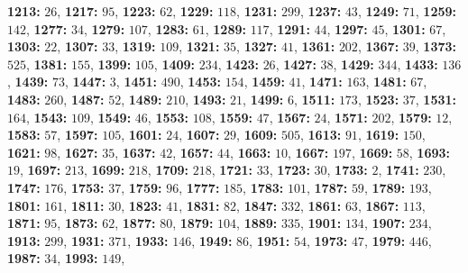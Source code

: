 \textsf{\bfseries 1213:} $26$, \textsf{\bfseries 1217:} $95$, \textsf{\bfseries 1223:} $62$, \textsf{\bfseries 1229:} $118$, 
\textsf{\bfseries 1231:} $299$, \textsf{\bfseries 1237:} $43$, \textsf{\bfseries 1249:} $71$, \textsf{\bfseries 1259:} $142$, \textsf{\bfseries 1277:} $34$, \textsf{\bfseries 1279:} $107$, \textsf{\bfseries 1283:} $61$, \textsf{\bfseries 1289:} $117$, \textsf{\bfseries 1291:} $44$, \textsf{\bfseries 1297:} $45$, \textsf{\bfseries 1301:} $67$, \textsf{\bfseries 1303:} $22$, \textsf{\bfseries 1307:} $33$, \textsf{\bfseries 1319:} $109$, \textsf{\bfseries 1321:} $35$, \textsf{\bfseries 1327:} $41$, \textsf{\bfseries 1361:} $202$, \textsf{\bfseries 1367:} $39$, \textsf{\bfseries 1373:} $525$, \textsf{\bfseries 1381:} $155$, \textsf{\bfseries 1399:} $105$, \textsf{\bfseries 1409:} $234$, \textsf{\bfseries 1423:} $26$, \textsf{\bfseries 1427:} $38$, \textsf{\bfseries 1429:} $344$, \textsf{\bfseries 1433:} $136$, \textsf{\bfseries 1439:} $73$, \textsf{\bfseries 1447:} $3$, \textsf{\bfseries 1451:} $490$, \textsf{\bfseries 1453:} $154$, \textsf{\bfseries 1459:} $41$, \textsf{\bfseries 1471:} $163$, \textsf{\bfseries 1481:} $67$, \textsf{\bfseries 1483:} $260$, \textsf{\bfseries 1487:} $52$, \textsf{\bfseries 1489:} $210$, \textsf{\bfseries 1493:} $21$, \textsf{\bfseries 1499:} $6$, \textsf{\bfseries 1511:} $173$, \textsf{\bfseries 1523:} $37$, \textsf{\bfseries 1531:} $164$, \textsf{\bfseries 1543:} $109$, \textsf{\bfseries 1549:} $46$, \textsf{\bfseries 1553:} $108$, \textsf{\bfseries 1559:} $47$, \textsf{\bfseries 1567:} $24$, \textsf{\bfseries 1571:} $202$, \textsf{\bfseries 1579:} $12$, \textsf{\bfseries 1583:} $57$, \textsf{\bfseries 1597:} $105$, \textsf{\bfseries 1601:} $24$, \textsf{\bfseries 1607:} $29$, \textsf{\bfseries 1609:} $505$, \textsf{\bfseries 1613:} $91$, \textsf{\bfseries 1619:} $150$, \textsf{\bfseries 1621:} $98$, \textsf{\bfseries 1627:} $35$, \textsf{\bfseries 1637:} $42$, \textsf{\bfseries 1657:} $44$, \textsf{\bfseries 1663:} $10$, \textsf{\bfseries 1667:} $197$, \textsf{\bfseries 1669:} $58$, \textsf{\bfseries 1693:} $19$, \textsf{\bfseries 1697:} $213$, \textsf{\bfseries 1699:} $218$, \textsf{\bfseries 1709:} $218$, \textsf{\bfseries 1721:} $33$, \textsf{\bfseries 1723:} $30$, \textsf{\bfseries 1733:} $2$, \textsf{\bfseries 1741:} $230$, \textsf{\bfseries 1747:} $176$, \textsf{\bfseries 1753:} $37$, \textsf{\bfseries 1759:} $96$, \textsf{\bfseries 1777:} $185$, \textsf{\bfseries 1783:} $101$, \textsf{\bfseries 1787:} $59$, \textsf{\bfseries 1789:} $193$, \textsf{\bfseries 1801:} $161$, \textsf{\bfseries 1811:} $30$, \textsf{\bfseries 1823:} $41$, \textsf{\bfseries 1831:} $82$, \textsf{\bfseries 1847:} $332$, \textsf{\bfseries 1861:} $63$, \textsf{\bfseries 1867:} $113$, \textsf{\bfseries 1871:} $95$, \textsf{\bfseries 1873:} $62$, \textsf{\bfseries 1877:} $80$, \textsf{\bfseries 1879:} $104$, \textsf{\bfseries 1889:} $335$, \textsf{\bfseries 1901:} $134$, \textsf{\bfseries 1907:} $234$, \textsf{\bfseries 1913:} $299$, \textsf{\bfseries 1931:} $371$, \textsf{\bfseries 1933:} $146$, \textsf{\bfseries 1949:} $86$, \textsf{\bfseries 1951:} $54$, \textsf{\bfseries 1973:} $47$, \textsf{\bfseries 1979:} $446$, \textsf{\bfseries 1987:} $34$, \textsf{\bfseries 1993:} $149$, 
